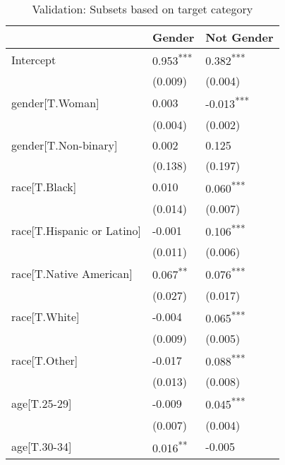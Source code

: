 \begin{table}
\caption{Validation: Subsets based on target category}
\label{}
\begin{center}
\begin{tabular}{lll}
\hline
                                  & Gender    & Not Gender   \\
\hline
Intercept                         & 0.953\textsuperscript{***}  & 0.382\textsuperscript{***}     \\
                                  & (0.009)   & (0.004)      \\
gender[T.Woman]                   & 0.003     & \cellcolor{red!25}-0.013\textsuperscript{***}    \\
                                  & (0.004)   & (0.002)      \\
gender[T.Non-binary]              & 0.002     & 0.125        \\
                                  & (0.138)   & (0.197)      \\
race[T.Black]                     & 0.010     & \cellcolor{green!25}0.060\textsuperscript{***}     \\
                                  & (0.014)   & (0.007)      \\
race[T.Hispanic or Latino]        & -0.001    & \cellcolor{green!25}0.106\textsuperscript{***}     \\
                                  & (0.011)   & (0.006)      \\
race[T.Native American]           & \cellcolor{green!25}0.067\textsuperscript{**}   & \cellcolor{green!25}0.076\textsuperscript{***}     \\
                                  & (0.027)   & (0.017)      \\
race[T.White]                     & -0.004    & \cellcolor{green!25}0.065\textsuperscript{***}     \\
                                  & (0.009)   & (0.005)      \\
race[T.Other]                     & -0.017    & \cellcolor{green!25}0.088\textsuperscript{***}     \\
                                  & (0.013)   & (0.008)      \\
age[T.25-29]                      & -0.009    & \cellcolor{green!25}0.045\textsuperscript{***}     \\
                                  & (0.007)   & (0.004)      \\
age[T.30-34]                      & \cellcolor{green!25}0.016\textsuperscript{**}   & -0.005       \\

\end{tabular}
\end{center}
\end{table}

